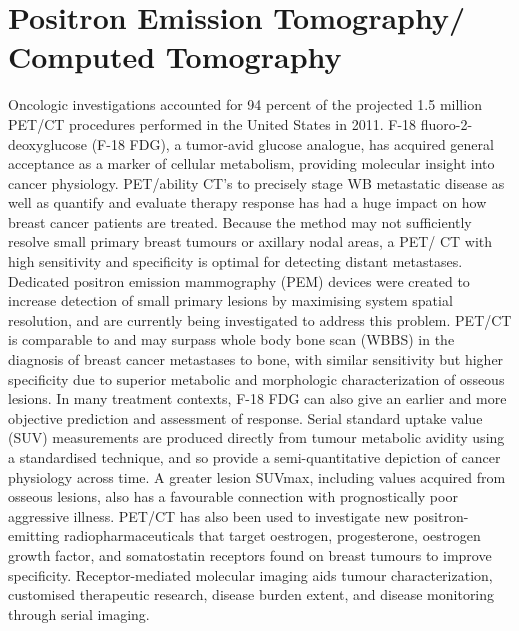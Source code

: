 \documentclass{article}
\begin{document}
\section{Positron Emission Tomography/ Computed Tomography}
Oncologic investigations accounted for 94 percent of the projected 1.5 million PET/CT 
procedures performed in the United States in 2011. F-18 fluoro-2-deoxyglucose (F-18 FDG), 
a tumor-avid glucose analogue, has acquired general acceptance as a marker of cellular 
metabolism, providing molecular insight into cancer physiology. PET/ability CT's to precisely 
stage WB metastatic disease as well as quantify and evaluate therapy response has had a 
huge impact on how breast cancer patients are treated.
Because the method may not sufficiently resolve small primary breast tumours or axillary 
nodal areas, a PET/ CT with high sensitivity and specificity is optimal for detecting distant 
metastases. Dedicated positron emission mammography (PEM) devices were created to 
increase detection of small primary lesions by maximising system spatial resolution, and are 
currently being investigated to address this problem. PET/CT is comparable to and may 
surpass whole body bone scan (WBBS) in the diagnosis of breast cancer metastases to bone, 
with similar sensitivity but higher specificity due to superior metabolic and morphologic 
characterization of osseous lesions.
In many treatment contexts, F-18 FDG can also give an earlier and more objective prediction 
and assessment of response. Serial standard uptake value (SUV) measurements are 
produced directly from tumour metabolic avidity using a standardised technique, and so 
provide a semi-quantitative depiction of cancer physiology across time. A greater lesion 
SUVmax, including values acquired from osseous lesions, also has a favourable connection 
with prognostically poor aggressive illness. PET/CT has also been used to investigate new 
positron-emitting radiopharmaceuticals that target oestrogen, progesterone, oestrogen 
growth factor, and somatostatin receptors found on breast tumours to improve specificity. 
Receptor-mediated molecular imaging aids tumour characterization, customised 
therapeutic research, disease burden extent, and disease monitoring through serial imaging.
\end{document}
